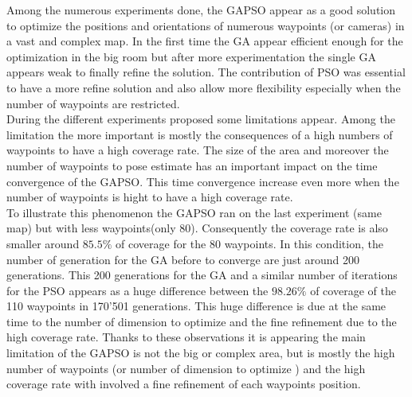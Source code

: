 Among the numerous experiments done, the GAPSO appear as a good solution to optimize the positions and orientations of numerous waypoints (or cameras) in a vast and complex map.
In the first time the GA appear efficient enough for the optimization in the big room but after more experimentation the single GA appears weak to finally refine the solution. The contribution of PSO was essential to have a more refine solution and also allow more flexibility especially when the number of waypoints are restricted. \\
During the different experiments proposed some limitations appear. Among the limitation the more important is mostly the consequences of a high numbers of waypoints to have a high coverage rate.
 The size of the area and moreover the number of waypoints to pose estimate has an important impact on the time convergence of the GAPSO.  This time convergence increase even more when the number of waypoints is hight to have a high coverage rate. \\
 To illustrate this phenomenon the GAPSO ran on the last experiment (same map) but  with less waypoints(only 80). Consequently the coverage rate is also smaller around $85.5\%$ of coverage for  the 80 waypoints. In this condition, the number of generation for the GA before to converge are just around 200 generations.  This 200 generations for the GA and a similar number of iterations for the PSO appears as a huge difference between the $98.26\%$ of coverage of the 110 waypoints in 170'501 generations. This huge difference is due at the same time to the number of dimension to optimize and the fine refinement due to the high coverage rate.
 Thanks to these observations it is appearing the main limitation of the GAPSO is not the  big or complex area, but is mostly the high number of waypoints (or number of dimension to optimize ) and the high coverage rate with involved a fine refinement of each waypoints position. 
 





